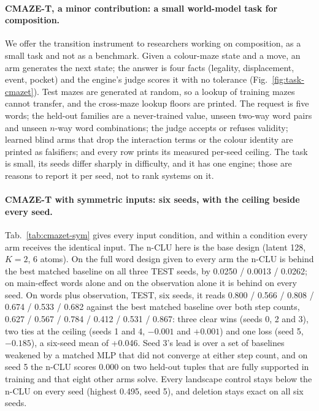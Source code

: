 \documentclass{article} %
\begin{document}
\paragraph{CMAZE-T, a minor contribution: a small world-model task for composition.} We offer the
transition instrument to researchers working on composition, as a small task and not as a benchmark.
Given a colour-maze state and a move, an arm generates the next state; the answer is four facts
(legality, displacement, event, pocket) and the engine's judge scores it with no tolerance
(Fig.~\ref{fig:task-cmazet}). Test mazes are generated at random, so a lookup of training mazes
cannot transfer, and the cross-maze lookup floors are printed. The request is five words; the
held-out families are a never-trained value, unseen two-way word pairs and unseen $n$-way word
combinations; the judge accepts or refuses validity; learned blind arms that drop the interaction
terms or the colour identity are printed as falsifiers; and every row prints its measured per-seed
ceiling. The task is small, its seeds differ sharply in difficulty, and it has one engine; those are
reasons to report it per seed, not to rank systems on it.

\paragraph{CMAZE-T with symmetric inputs: six seeds, with the ceiling beside every seed.}
Tab.~\ref{tab:cmazet-sym} gives every input condition, and within a condition every arm receives the
identical input. The n-CLU here is the base design (latent 128, $K=2$, 6 atoms). On the full word design given
to every arm the n-CLU is behind the best matched baseline on all three TEST seeds, by 0.0250 / 0.0013 /
0.0262; on main-effect words alone and on the observation alone it is behind on every seed. On words
plus observation, TEST, six seeds, it reads 0.800 / 0.566 / 0.808 / 0.674 / 0.533 / 0.682 against the
best matched baseline over both step counts, 0.627 / 0.567 / 0.784 / 0.412 / 0.531 / 0.867: three
clear wins (seeds 0, 2 and 3), two ties at the ceiling (seeds 1 and 4, $-0.001$ and $+0.001$) and
one loss (seed 5, $-0.185$), a six-seed mean of +0.046. Seed 3's lead is over a set of baselines weakened
by a matched MLP that did not converge at either step count, and on seed 5 the n-CLU scores 0.000 on two
held-out tuples that are fully supported in training and that eight other arms solve. Every landscape
control stays below the n-CLU on every seed (highest 0.495, seed 5), and deletion stays exact on all
six seeds.
\end{document}
